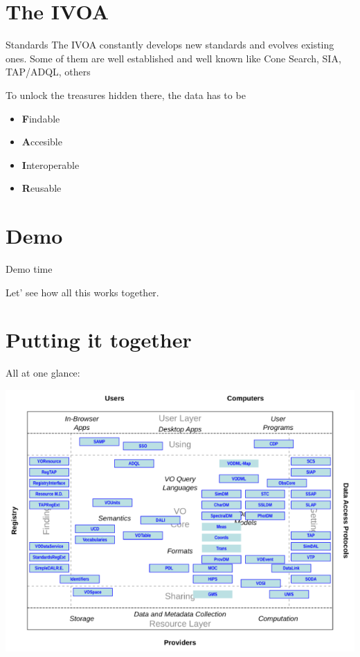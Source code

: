 \documentclass{beamer}
\begin{document}
\section{The IVOA}

\begin{frame}{Standards}
The IVOA constantly develops new standards and evolves existing ones.
Some of them are well established and well known like Cone Search, SIA,
TAP/ADQL, others 


To unlock the treasures hidden there, the data has to be
\begin{itemize}
\item \textbf{F}indable
\item \textbf{A}ccesible
\item \textbf{I}nteroperable
\item \textbf{R}eusable
\end{itemize}
\end{frame}




\section{Demo}

\begin{frame}{Demo time}

Let' see how all this works together.

\end{frame}



\section{Putting it together}

\begin{frame}{All at one glance:}

\includegraphics[width=\linewidth]{archdiag2.png}
\end{frame}
\end{document}
